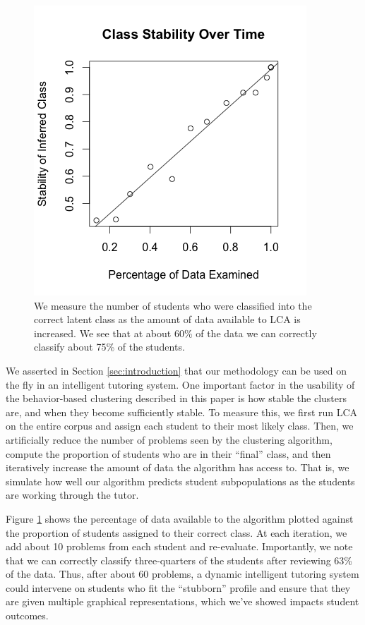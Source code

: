 \documentclass{edm_template}
\begin{document}
\begin{figure}
\includegraphics[scale=.6]{class-stability.png}
\caption{We measure the number of students who were classified into the correct latent class as the amount of data available to LCA is increased. We see that at about 60\% of the data we can correctly classify about 75\% of the students.}
\label{fig:class-stability}
\end{figure}

We asserted in Section \ref{sec:introduction} that our methodology can be used on the fly in an intelligent tutoring system. One important factor in the usability of the behavior-based clustering described in this paper is how stable the clusters are, and when they become sufficiently stable. To measure this, we first run LCA on the entire corpus and assign each student to their most likely class. Then, we artificially reduce the number of problems seen by the clustering algorithm, compute the proportion of students who are in their ``final'' class, and then iteratively increase the amount of data the algorithm has access to. That is, we simulate how well our algorithm predicts student subpopulations as the students are working through the tutor. 

Figure \ref{fig:class-stability} shows the percentage of data available to the algorithm plotted against the proportion of students assigned to their correct class. At each iteration, we add about 10 problems from each student and re-evaluate. Importantly, we note that we can correctly classify three-quarters of the students after reviewing 63\% of the data. Thus, after about 60 problems, a dynamic intelligent tutoring system could intervene on students who fit the ``stubborn'' profile and ensure that they are given multiple graphical representations, which we've showed impacts student outcomes.
\end{document}
